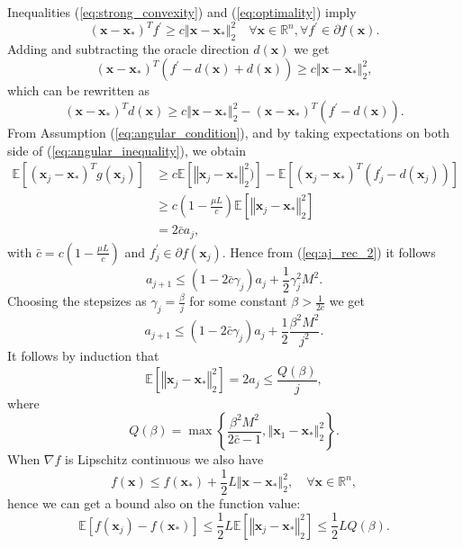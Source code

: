 \documentclass{article}
\renewcommand{\vec}[1]{\boldsymbol{#1}}
\newcommand{\norm}[1]{\left\Vert #1 \right\Vert}
\begin{document}
Inequalities (\ref{eq:strong_convexity}) and (\ref{eq:optimality}) imply
\begin{equation}
	(\vec{x}-\vec{x}_*)^T f^\prime \geq c \norm{\vec{x}-\vec{x}_*}^2_2 \quad \forall \vec{x} \in \mathbb{R}^n, \forall f^\prime\in\partial f(\vec{x}).
\end{equation}
Adding and subtracting the oracle direction $d(\vec{x})$ we get
\begin{equation}
	(\vec{x}-\vec{x}_*)^T (f^\prime -d(\vec{x}) +d(\vec{x})) \geq c \norm{\vec{x}-\vec{x}_*}^2_2,
\end{equation}
which can be rewritten as
\begin{equation}
		(\vec{x}-\vec{x}_*)^T d(\vec{x}) \geq c \norm{\vec{x}-\vec{x}_*}^2_2 - (\vec{x}-\vec{x}_*)^T (f^\prime -d(\vec{x})).
		\label{eq:angular_inequality}
\end{equation}
From Assumption (\ref{eq:angular_condition}), and by taking expectations on both side of (\ref{eq:angular_inequality}), we obtain
\begin{align}
\mathbb{E}[(\vec{x}_j-\vec{x}_*)^T g(\vec{x}_j)] &\geq c \mathbb{E}[\norm{\vec{x}_j-\vec{x}_*}^2_2)] - \mathbb{E}[(\vec{x}_j-\vec{x}_*)^T (f_j^\prime -d(\vec{x}_j))]\\
 &\geq c(1-\frac{\mu L}{c}) \mathbb{E}[\norm{\vec{x}_j-\vec{x}_*}^2_2]\\
 & = 2\bar{c}a_j,
\end{align}
with $\bar{c}=c(1-\frac{\mu L }{c})$ and $f_j^\prime \in \partial f(\vec{x}_j)$.
Hence from (\ref{eq:aj_rec_2}) it follows 
\begin{equation}
	a_{j+1} \leq (1-2\bar{c}\gamma_j)a_j + \frac{1}{2}\gamma_j^2M^2.
\end{equation}
Choosing the stepsizes as $\gamma_j = \frac{\beta}{j}$ for some constant $\beta>\frac{1}{2\bar{c}}$ we get
\begin{equation}
		a_{j+1} \leq (1-2\bar{c}\gamma_j)a_j + \frac{1}{2}\frac{\beta^2M^2}{j^2}.
\end{equation}
It follows by induction that
\begin{equation}
	\mathbb{E}[\norm{\vec{x}_j - \vec{x}_*}^2_2] = 2a_j\leq \frac{Q(\beta)}{j},
\end{equation}
where 
\begin{equation}
	Q(\beta) = \max\left\{\frac{\beta^2M^2}{2\bar{c}-1},\norm{\vec{x}_1 - \vec{x}_*}^2_2 \right\}.
\end{equation}
When $\nabla f$ is Lipschitz continuous we also have
\begin{equation}
	f(\vec{x})\leq f(\vec{x}_*) + \frac{1}{2}L\norm{\vec{x} - \vec{x}_*}^2_2, \quad \forall \vec{x} \in \mathbb{R}^n,
\end{equation}
hence we can get a bound also on the function value:
\begin{equation}
	\mathbb{E}[f(\vec{x}_j)-f(\vec{x}_*)] \leq \frac{1}{2} L \mathbb{E}[\norm{\vec{x}_j - \vec{x}_*}^2_2] \leq \frac{1}{2}LQ(\beta).
\end{equation}
\end{document}
